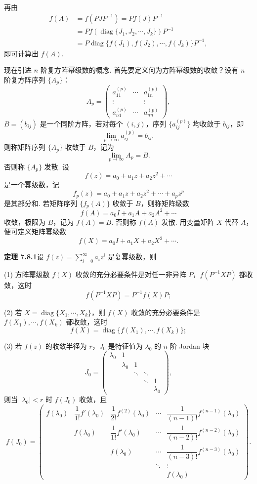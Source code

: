 \documentclass[UTF8, 12pt, fontset=fandol, oneside]{ctexart}
\begin{document}
再由
\[
\begin{aligned}
f(A)&=f(PJP^{-1})=Pf(J)P^{-1}\\
&=Pf(\operatorname{diag}\{J_1,J_2,\cdots,J_k\})P^{-1}\\
&=P\operatorname{diag}\{f(J_1),f(J_2),\cdots,f(J_k)\}P^{-1},
\end{aligned}
\]
即可计算出 $f(A)$.

现在引进 $n$ 阶复方阵幂级数的概念. 首先要定义何为方阵幂级数的收敛？设有 $n$ 阶复方阵序列 $\{A_p\}$：
\[
A_p=\left(\begin{array}{ccc}
a_{11}^{(p)} & \cdots & a_{1n}^{(p)}\\
\vdots & & \vdots\\
a_{n1}^{(p)} & \cdots & a_{nn}^{(p)}
\end{array}\right),
\]
$B=(b_{ij})$ 是一个同阶方阵，若对每个 $(i,j)$，序列 $\{a_{ij}^{(p)}\}$ 均收敛于 $b_{ij}$，即
\[
\lim_{p\to\infty}a_{ij}^{(p)}=b_{ij},
\]
则称矩阵序列 $\{A_p\}$ 收敛于 $B$，记为
\[
\lim_{p\to\infty}A_p=B.
\]
否则称 $\{A_p\}$ 发散. 设
\[
f(z)=a_0+a_1z+a_2z^2+\cdots
\]
是一个幂级数，记
\[
f_p(z)=a_0+a_1z+a_2z^2+\cdots+a_pz^p
\]
是其部分和. 若矩阵序列 $\{f_p(A)\}$ 收敛于 $B$，则称矩阵级数
\begin{equation}
f(A)=a_0I+a_1A+a_2A^2+\cdots
\tag{7.8.3}
\end{equation}
收敛，极限为 $B$，记为 $f(A)=B$. 否则称 $f(A)$ 发散. 用变量矩阵 $X$ 代替 $A$，便可定义矩阵幂级数
\begin{equation}
f(X)=a_0I+a_1X+a_2X^2+\cdots.
\tag{7.8.4}
\end{equation}

\noindent\textbf{定理 7.8.1}\quad 设 $f(z)=\sum_{i=0}^{\infty}a_iz^i$ 是复幂级数，则

(1) 方阵幂级数 $f(X)$ 收敛的充分必要条件是对任一非异阵 $P$，$f(P^{-1}XP)$ 都收敛，这时
\[
f(P^{-1}XP)=P^{-1}f(X)P;
\]

(2) 若 $X=\operatorname{diag}\{X_1,\cdots,X_k\}$，则 $f(X)$ 收敛的充分必要条件是 $f(X_1),\cdots,f(X_k)$ 都收敛，这时
\[
f(X)=\operatorname{diag}\{f(X_1),\cdots,f(X_k)\};
\]

(3) 若 $f(z)$ 的收敛半径为 $r$，$J_0$ 是特征值为 $\lambda_0$ 的 $n$ 阶 Jordan 块
\[
J_0=\left(\begin{array}{ccccc}
\lambda_0 & 1 & & & \\
& \lambda_0 & 1 & & \\
& & \ddots & \ddots & \\
& & & \ddots & 1\\
& & & & \lambda_0
\end{array}\right),
\]
则当 $|\lambda_0|<r$ 时 $f(J_0)$ 收敛，且
\[
f(J_0)=\left(\begin{array}{ccccc}
f(\lambda_0) & \dfrac1{1!}f'(\lambda_0) & \dfrac1{2!}f^{(2)}(\lambda_0) & \cdots & \dfrac1{(n-1)!}f^{(n-1)}(\lambda_0)\\
& f(\lambda_0) & \dfrac1{1!}f'(\lambda_0) & \cdots & \dfrac1{(n-2)!}f^{(n-2)}(\lambda_0)\\
& & f(\lambda_0) & \cdots & \dfrac1{(n-3)!}f^{(n-3)}(\lambda_0)\\
& & & \ddots & \vdots\\
& & & & f(\lambda_0)
\end{array}\right).
\]
\end{document}
